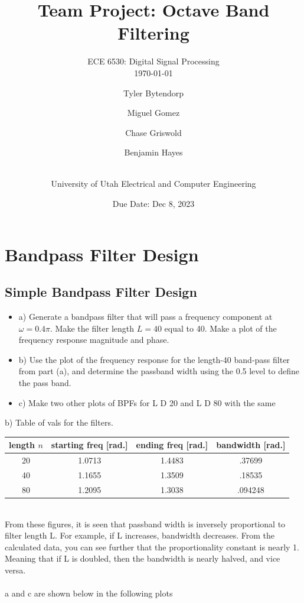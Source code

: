 \documentclass[a4paper, 11pt]{exam}
\title{Team Project: Octave Band Filtering}
\subtitle{ECE 6530: Digital Signal Processing \\
\today\\}
\author{ Tyler Bytendorp \and Miguel Gomez \and Chase Griswold \and Benjamin Hayes \and\\
University of Utah Electrical and Computer Engineering}
\date{Due Date: Dec 8, 2023}
\begin{document}
\maketitle
\noindent
\setcounter{section}{3}
\section{Bandpass Filter Design}
\subsection{Simple Bandpass Filter Design}
\begin{itemize}
  \item a) Generate a bandpass filter that will pass a frequency component at $\omega = 0.4 \pi$. Make the filter length $L = 40$ equal to 40. Make a plot of the frequency response magnitude and phase. \\ 
  \item b) Use the plot of the frequency response for the length-40 band-pass filter from part (a), and determine the passband width using the 0.5 level to define the pass band. \\ 
  \item c)  Make two other plots of BPFs for L D 20 and L D 80 with the same \\
\end{itemize}
b) Table of vals for the filters.\\
\begin{table}[!ht]
  \centering
  \begin{tabular}{|c|c|c|c|}
    \hline
    length $n$&starting freq [rad.]&ending freq [rad.]&bandwidth [rad.]\\
    \hline
    20&1.0713&1.4483&.37699\\
    \hline
    40&1.1655&1.3509&.18535\\
    \hline
    80&1.2095&1.3038&.094248\\
    \hline 
  \end{tabular}
\end{table}\\
From these figures, it is seen that passband width is inversely proportional to filter length L. For example, if L increases, bandwidth decreases. From the calculated data, you can see further that the proportionality constant is nearly 1. Meaning that if L is doubled, then the bandwidth is nearly halved, and vice versa.\\\\
\newpage
a and c are shown below in the following plots
\end{document}
